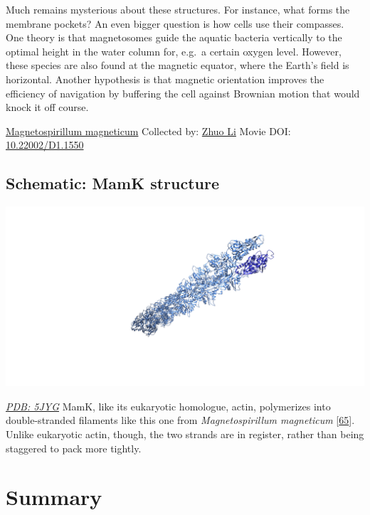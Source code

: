 \documentclass[]{tufte-book}
\begin{document}
Much remains mysterious about these structures. For instance, what forms the membrane pockets? An even bigger question is how cells use their compasses. One theory is that magnetosomes guide the aquatic bacteria vertically to the optimal height in the water column for, e.g.~a certain oxygen level. However, these species are also found at the magnetic equator, where the Earth's field is horizontal. Another hypothesis is that magnetic orientation improves the efficiency of navigation by buffering the cell against Brownian motion that would knock it off course.



\hypertarget{htmlwidget-a0b25e030a70243c8dea}{}

\label{fig:7-6}\protect\hyperlink{tree}{Magnetospirillum magneticum} Collected by: \protect\hyperlink{zhuo_li}{Zhuo Li} Movie DOI: \href{https://doi.org/10.22002/D1.1550}{10.22002/D1.1550}

\hypertarget{MamK_structure}{%
\subsection*{Schematic: MamK structure}\label{MamK_structure}}

\includegraphics{img/schematics/7_6_1}

\href{http://rcsb.org/structure/5JYG}{\emph{PDB: 5JYG}}
MamK, like its eukaryotic homologue, actin, polymerizes into double-stranded filaments like this one from \emph{Magnetospirillum magneticum} {[}\protect\hyperlink{ref-bergeron2017}{65}{]}. Unlike eukaryotic actin, though, the two strands are in register, rather than being staggered to pack more tightly.

\hypertarget{summary-6}{%
\section{Summary}\label{summary-6}}
\end{document}
